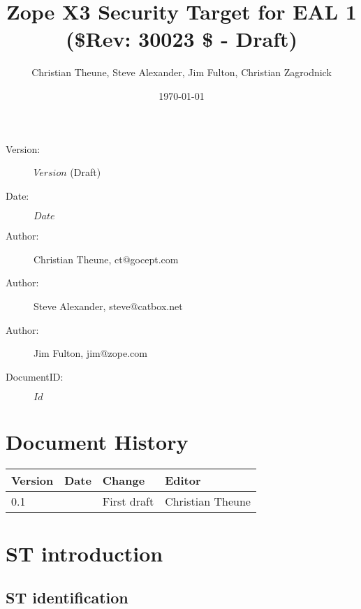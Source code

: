 \documentclass[12pt,english]{scrbook}
\title{Zope X3 Security Target for EAL 1 ({\$}Rev: 30023 {\$} - Draft)}
\author{Christian Theune, Steve Alexander, Jim Fulton, Christian Zagrodnick}
\date{\today}
\begin{document}
\maketitle


\begin{description}
    \item[Version:] $Version$ (Draft)
    \item[Date:] $Date$ 
    \item[Author:] Christian Theune, ct@gocept.com
    \item[Author:] Steve Alexander, steve@catbox.net
    \item[Author:] Jim Fulton, jim@zope.com
    \item[DocumentID:] $Id$
\end{description}

\newpage

\tableofcontents





\chapter{Document History}

\begin{longtable}{|l|l|l|l|}
\hline
\textbf{
Version
} & \textbf{
Date
} & \textbf{
Change
} & \textbf{
Editor
} \\
\hline
\endhead

0.1
 &  & 
First draft
 & 
Christian Theune
 \\
\hline
\end{longtable}





\chapter{ST introduction}





\section{ST identification}
\end{document}
